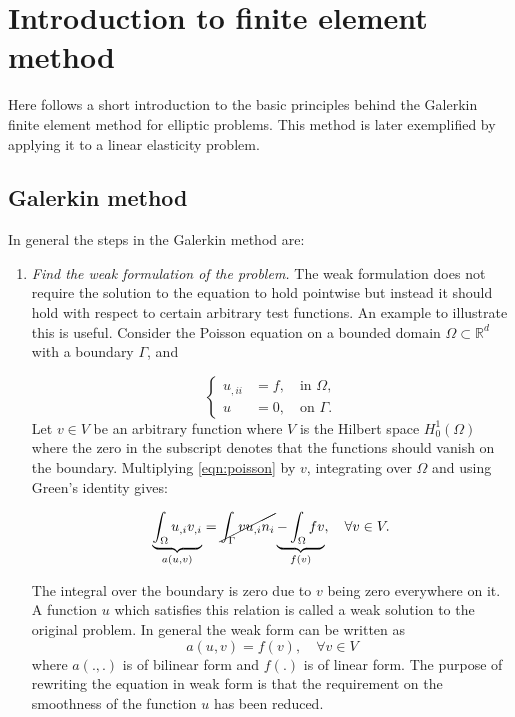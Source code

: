 \documentclass[fem.tex]{subfiles}
\begin{document}
\chapter{Introduction to finite element method}

Here follows a short introduction to the basic principles behind the Galerkin finite element method for elliptic problems.  This method is later exemplified by applying it to a linear elasticity problem.

\section{Galerkin method}
\label{sec:galerkin}

In general the steps in the Galerkin method are:
\begin{enumerate}
\item \emph{Find the weak formulation of the problem.} The weak formulation does not require the solution to the equation to hold pointwise but instead it should hold with respect to certain arbitrary test functions. An example to illustrate this is useful. Consider the Poisson equation on a bounded domain $\Omega \subset \mathbb{R}^d$ with a boundary $\Gamma$, and


\begin{equation}
\label{eqn:poisson}
\left\{ \begin{array}{ll}
u_{,ii} & = f, \quad \text{in } \Omega, \\
u & = 0, \quad  \text{on } \Gamma. \end{array} \right.
\end{equation}
Let $v \in V$ be an arbitrary function where $V$ is the Hilbert space $H_0^1(\Omega)$ where the zero in the subscript denotes that the functions should vanish on the boundary. Multiplying \ref{eqn:poisson} by $v$, integrating over $\Omega$ and using Green's identity gives:

\begin{align}
\underbrace{\int_\Omega u_{,i} v_{,i}}_{a(u,v)} = \cancel{\int_\Gamma v u_{,i} n_i } \underbrace{- \int_\Omega fv}_{f(v)}, \quad \forall v \in V.
\end{align}

The integral over the boundary is zero due to $v$ being zero everywhere on it. A function $u$ which satisfies this relation is called a weak solution to the original problem. In general the weak form can be written as
\begin{equation}
\label{eqn_weak}
    a(u,v) = f(v), \quad \forall v \in V
\end{equation}
where $a(.,.)$ is of bilinear form and $f(.)$ is of linear form. The purpose of rewriting the equation in weak form is that the requirement on the smoothness of the function $u$ has been reduced. 


\end{enumerate}
\end{document}
